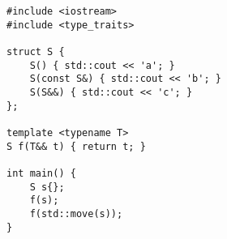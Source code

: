 \begin{lstlisting}[title=\href{https://godbolt.org/z/rYE5ny}{\texttt{godbolt.org/z/rYE5ny}}]
#include <iostream>
#include <type_traits>

struct S {
    S() { std::cout << 'a'; }
    S(const S&) { std::cout << 'b'; }
    S(S&&) { std::cout << 'c'; }
};

template <typename T>
S f(T&& t) { return t; }

int main() {
    S s{};
    f(s);
    f(std::move(s));
}
\end{lstlisting}
